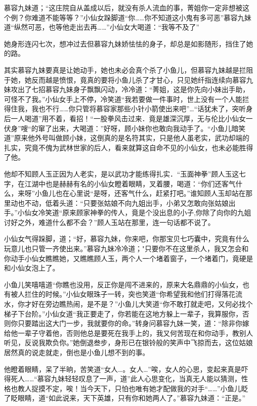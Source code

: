 \documentclass[12pt,oneside]{book}
\begin{document}
慕容九妹道；``这庄院自从盖成以后，就没有杀人流血的事，菁姐你一定非想被这个例？你难道不能等等？''小仙女跺脚道``你\ldots\ldots 你不知道这小鬼有多可恶''慕容九妹道``纵然可恶，也等他走出去再\ldots\ldots{}''小仙女大喝道：``我等不及了''

她身形连闪七次，想冲过去但慕容九妹娇怯怯的身子，却总是如影随形，挡住了她的路。

其实慕容九妹要真是让她动手，她也未必会真个杀了小鱼儿，但慕容九妹越是拦阻于她，她反而越是愤恨，竟真的要将小鱼儿杀了才甘心，只见她纤指连续向慕容九妹攻出了七招慕容九妹身子飘飘闪动，冷冷道：``菁姐，这是你先向小妹出手助，可怪不了我。''小仙女手上不停，冷笑道``我若要做一件事时，世上没有一个人能拦得住我，我也不行\ldots\ldots 你只管将慕容家那些小针小箭使出来吧''\ldots{}``话犹未了，突听身后一人喝道''用不着，看招！``一股拳风击过来．竟是雄深沉厚，无与伦比小仙女一伏身''嗖``的窜了出来，大喝道：''好呀，顾小妹你也敢向我动手了。``小鱼儿暗笑道''原来他外号叫做顾小妹，这倒真的是名符其实，只是他人虽老实，武功却端的扎实，究竟不傀为武林世家的后人，看来就算这自命不见的小仙女，也未必能胜得了他。

他却不知顾人玉正因为人老实，是以武功才能练得扎实．``玉面神拳''顾人玉这七字，在江湖中也是赫赫有名的小仙女瞪着眼睛，叉着腰，喝道：``你们还客气什么，来呀''小鱼儿也在心里说``是呀，还客气什么，赶紧打吧。''谁知顾人玉却站在那里动也不动，低着头道：``只要张姑娘不向九姐出手，小弟又怎敢向张姑娘出手。''小仙女冷笑道``原来顾家神拳的传人，竟是个没出息的小子,你除了向你的九姐讨好之外，难道什么都不会？''顾人玉站在那里，连一句话都不说了。

小仙女气得跺脚，道；``好，慕容九妹，你来吧，你那宝贝七巧囊中，究竟有什么玩意儿也只管一齐使出来。''慕容九妹冷冷道；"只要你不在这里杀人，我又怎会和你动手小仙女瞧瞧她，又瞧瞧顾人玉，两个人一个堵着窗子，一个堵着门，竟硬是和小仙女泡上了。

小鱼儿笑嘻嘻道``你瞧也没用，反正你是闯不进来的，原来大名鼎鼎的小仙女，也有被人拦住的时候。''小仙女眼珠子一转，突也笑道``你希望我和他们打得落花流水，你才好在旁边瞧热闹，是不是？''小鱼儿大笑道``你不敢打就走吧，又何必找个梯子下台阶。''小仙女道``我正要走了，你若能在这地方躲上一辈子，我算服你，否则你只要踏出这大门一步，我就要你的命。''转身问慕容九妹一笑，道：``除非你嫁给他一辈子守着他，否则他总是要死在我手上的，我又何苦现在和你动手，教别人听见，反说我欺负你。''她倒退叁步，身形已在银铃般的笑声中飞掠而去，这位姑娘居然真的说走就走，倒也是小鱼儿想不到的事。

他瞪着眼睛，呆了半晌，苦笑道``女人\ldots。女人\ldots{}''唉，女人的心思，变起来真是吓得死人\ldots\ldots{}``慕容九妹轻轻叹息了一声，道''此人心思变化，当真无人能以猜测，性格也教人捉摸不定，唉！当今天下，只怕也唯有她才配做我的对手``\ldots\ldots{}''小鱼儿眨了眨眼睛，道``如此说来，天下英雄，只有你和她两人了。''慕容九妹道：``正是。''
\end{document}
